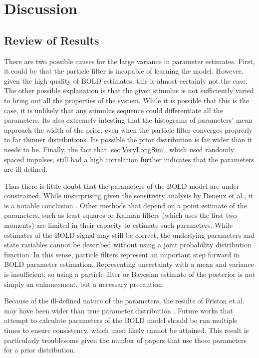 \chapter{Discussion}
\label{sec:Discussion}
\section{Review of Results}
There are two possible causes for the large variance in
parameter estimates. First, it could be that the particle filter is
incapable of learning the model. However, given the high quality
of BOLD estimates, this is almost certainly not the case. The other 
possible explanation is that the given stimulus is not sufficiently
varied to bring out all the properties of the system. While it is 
possible that this is the case, it is unlikely that any
stimulus sequence could differentiate all the parameters. 
Its also extremely intesting that the histograms of parameters' mean
approach the width of the prior, even when the particle filter converges
proprerly to far thinner distributions. Its possible the prior 
distribution is far wider than 
it needs to be. Finally, the fact that \autoref{sec:VeryLongSim}, which 
used randomly spaced impulses,
still had a high correlation further indicates that the parameters
are ill-defined. 

Thus there is little doubt that the parameters of the BOLD model are under
constrained. While unsurprising given the sensitivity analysis by Deneux et al.,
it is a notable conclusion \cite{Deneux2006}. Other methods
that depend on a point estimate of the parameters, such as least squares 
or Kalman filters (which uses the first two moments) are limited in their
capacity to estimate such parameters. While estimates of
the  BOLD signal may still be correct, the 
underlying parameters and state variables cannot be described without using
a joint probability distribution function. In this sense, particle 
filters represent an important step forward in BOLD parameter 
estimation. Representing uncertainty with a mean
and variance is insufficient; so using a particle filter
or Bayesian estimate of the posterior is not simply an enhancement, 
but a necessary precaution.

Because of the ill-defined nature of the parameters, the results 
of Friston et al. may have been wider than true parameter distribution
\cite{Friston2002}. Future works that attempt to calculate parameters
of the BOLD model should be run multiple times to ensure consistency,
which most likely cannot be attained. This result is particularly
troublesome given the number of papers that use those parameters for
a prior distribution.

